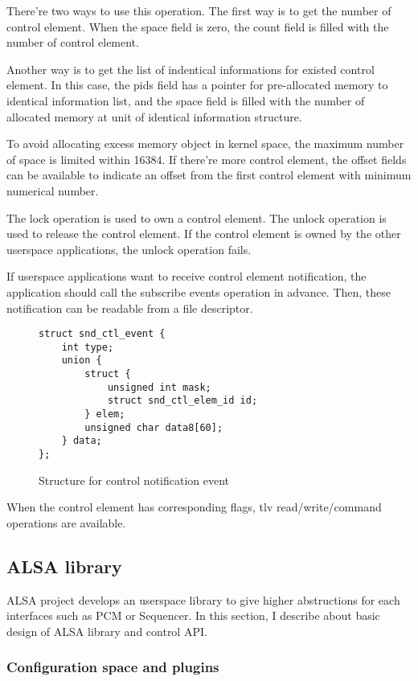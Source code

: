 \documentclass[onecolumn]{article}
\begin{document}
There're two ways to use this operation. The first way is to get the number of control element. When the space field is zero, the count field is filled with the number of control element.

Another way is to get the list of indentical informations for existed control element. In this case, the pids field has a pointer for pre-allocated memory to identical information list, and the space field is filled with the number of allocated memory at unit of identical information structure.

To avoid allocating excess memory object in kernel space, the maximum number of space is limited within 16384. If there're more control element, the offset fields can be available to indicate an offset from the first control element with minimum numerical number.

The lock operation is used to own a control element. The unlock operation is used to release the control element. If the control element is owned by the other userspace applications, the unlock operation fails.

If userspace applications want to receive control element notification, the application should call the subscribe events operation in advance. Then, these notification can be readable from a file descriptor.

\begin{figure}[htbp]
\small
\begin{verbatim}
struct snd_ctl_event {
    int type;
    union {
        struct {
            unsigned int mask;
            struct snd_ctl_elem_id id;
        } elem;
        unsigned char data8[60];
    } data;
};
\end{verbatim}
\caption{{Structure for control notification event}}
\label{snd-ctl-event}
\end{figure}

When the control element has corresponding flags, tlv read/write/command operations are available.


\subsection{ALSA library}

ALSA project develops an userspace library to give higher abstructions for each interfaces such as PCM or Sequencer. In this section, I describe about basic design of ALSA library and control API.


\subsubsection{Configuration space and plugins}
\end{document}
